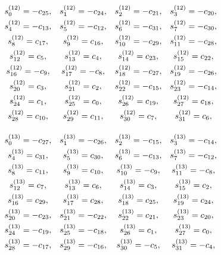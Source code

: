 \documentclass{jtacs}
\numberwithin{equation}{section}
\begin{document}
\begin{center}
\begin{adjustbox}{width=0.57\textwidth, margin=0 0 0 0}
$
\begin{array}{cccc}
\renewcommand*{\arraystretch}{1.5}
\begin{matrix}

s_{0}^{(12)}=-c_{25}, & 	s_{1}^{(12)}=-c_{24}, &  	s_{2}^{(12)}=-c_{21}, & 	s_{3}^{(12)}=-c_{20}, \\	s_{4}^{(12)}=-c_{13}, & 	s_{5}^{(12)}=-c_{12}, & 	s_{6}^{(12)}=-c_{31}, & 	s_{7}^{(12)}=-c_{30}, \\
s_{8}^{(12)}=c_{17}, & 	s_{9}^{(12)}=c_{16}, & 	s_{10}^{(12)}=-c_{29}, & 	s_{11}^{(12)}=-c_{28}, \\	s_{12}^{(12)}=c_{5}, & 	s_{13}^{(12)}=c_{4}, & 	s_{14}^{(12)}=c_{23}, & 	s_{15}^{(12)}=c_{22}, \\
s_{16}^{(12)}=-c_{9}, & 	s_{17}^{(12)}=-c_{8}, & 	s_{18}^{(12)}=-c_{27}, & 	s_{19}^{(12)}=-c_{26}, \\	s_{20}^{(12)}=c_{3}, & 	s_{21}^{(12)}=c_{2}, & 	s_{22}^{(12)}=-c_{15}, & 	s_{23}^{(12)}=-c_{14}, \\
s_{24}^{(12)}=c_{1}, & 	s_{25}^{(12)}=c_{0}, & 	s_{26}^{(12)}=c_{19}, & 	s_{27}^{(12)}=c_{18}, \\	s_{28}^{(12)}=c_{10}, & 	s_{29}^{(12)}=c_{11}, & 	s_{30}^{(12)}=c_{7}, & 	s_{31}^{(12)}=c_{6}, \\
\end{matrix}
\end{array}
$
\end{adjustbox}
\end{center}

\begin{center}
\begin{adjustbox}{width=0.57\textwidth, margin=0 0 0 0}
$
\begin{array}{cccc}
\renewcommand*{\arraystretch}{1.5}
\begin{matrix}
s_{0}^{(13)}=-c_{27}, & 	s_{1}^{(13)}=-c_{26}, & 	s_{2}^{(13)}=-c_{15}, & 	s_{3}^{(13)}=-c_{14}, \\	s_{4}^{(13)}=c_{31}, & 	s_{5}^{(13)}=c_{30}, & 	s_{6}^{(13)}=-c_{13}, & 	s_{7}^{(13)}=-c_{12}, \\
s_{8}^{(13)}=c_{11}, & 	s_{9}^{(13)}=c_{10}, & 	s_{10}^{(13)}=-c_{9}, & 	s_{11}^{(13)}=-c_{8}, \\	s_{12}^{(13)}=c_{7}, & 	s_{13}^{(13)}=c_{6}, & 	s_{14}^{(13)}=c_{3}, & 	s_{15}^{(13)}=c_{2}, \\
s_{16}^{(13)}=c_{29}, & 	s_{17}^{(13)}=c_{28}, & 	s_{18}^{(13)}=c_{25}, & 	s_{19}^{(13)}=c_{24}, \\	s_{20}^{(13)}=-c_{23}, & 	s_{21}^{(13)}=-c_{22}, & 	s_{22}^{(13)}=c_{21}, & 	s_{23}^{(13)}=c_{20}, \\
s_{24}^{(13)}=-c_{19}, & 	s_{25}^{(13)}=-c_{18}, & 	s_{26}^{(13)}=c_{1}, & 	s_{27}^{(13)}=c_{0}, \\	s_{28}^{(13)}=-c_{17}, & 	s_{29}^{(13)}=-c_{16}, & 	s_{30}^{(13)}=-c_{5}, & 	s_{31}^{(13)}=-c_{4}, \\
\end{matrix}
\end{array}
$
\end{adjustbox}
\end{center}
\end{document}
